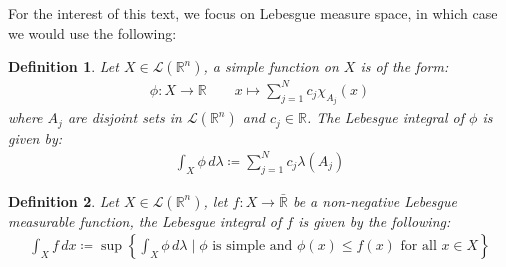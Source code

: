 \documentclass[11pt]{book}
\theoremstyle{break}
\theoremstyle{break}
\newtheorem{defn}{Definition}[corL]
\newcommand{\R}{\mathbb{R}}
\begin{document}
For the interest of this text, we focus on Lebesgue measure space, in which case we would use the following:
\begin{defn}
Let $X\in \mathcal{L}(\R^n)$, a simple function on $X$ is of the form:
\begin{align*}
\phi:X \to \R \qquad x\mapsto\sum_{j=1}^N c_j \chi_{A_j}(x)
\end{align*}
where $A_j$ are disjoint sets in $\mathcal{L}(\R^n)$ and $c_j \in \R$. The Lebesgue integral of $\phi$ is given by:
\begin{align*}
\int_X \phi \, d\lambda \coloneqq \sum_{j=1}^N c_j \lambda(A_j)
\end{align*}
\end{defn}

\begin{defn}
Let $X\in \mathcal{L}(\R^n)$, let $f:X \to \bar{\R}$ be a non-negative Lebesgue measurable function, the Lebesgue integral of $f$ is given by the following:
\begin{align*}
\int_X f \, dx \coloneqq \sup \left\{ \int_X \phi \, d\lambda \mid \phi \text{ is simple and }\phi(x) \leq f(x) \text{ for all }x\in X\right\}
\end{align*}
\end{defn}
\end{document}
